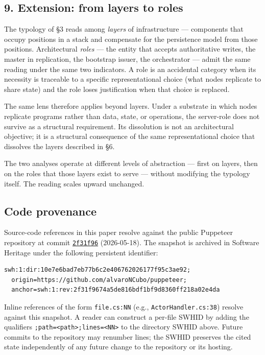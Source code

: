 \documentclass[
]{article}
\begin{document}
\subsection{9. Extension: from layers to
roles}\label{extension-from-layers-to-roles}

The typology of §3 reads among \emph{layers} of infrastructure ---
components that occupy positions in a stack and compensate for the
persistence model from those positions. Architectural \emph{roles} ---
the entity that accepts authoritative writes, the master in replication,
the bootstrap issuer, the orchestrator --- admit the same reading under
the same two indicators. A role is an accidental category when its
necessity is traceable to a specific representational choice (what nodes
replicate to share state) and the role loses justification when that
choice is replaced.

The same lens therefore applies beyond layers. Under a substrate in
which nodes replicate programs rather than data, state, or operations,
the server-role does not survive as a structural requirement. Its
dissolution is not an architectural objective; it is a structural
consequence of the same representational choice that dissolves the
layers described in §6.

The two analyses operate at different levels of abstraction --- first on
layers, then on the roles that those layers exist to serve --- without
modifying the typology itself. The reading scales upward unchanged.

\subsection{Code provenance}\label{code-provenance}

Source-code references in this paper resolve against the public
Puppeteer repository at commit
\href{https://github.com/alvaroNCubo/puppeteer/tree/2f31f9674a5de816bdf1bf9d8360ff218a02e4da}{\texttt{2f31f96}}
(2026-05-18). The snapshot is archived in Software Heritage under the
following persistent identifier:

\begin{verbatim}
swh:1:dir:10e7e6bad7eb77b6c2e406762026177f95c3ae92;
  origin=https://github.com/alvaroNCubo/puppeteer;
  anchor=swh:1:rev:2f31f9674a5de816bdf1bf9d8360ff218a02e4da
\end{verbatim}

Inline references of the form \texttt{file.cs:NN} (e.g.,
\texttt{ActorHandler.cs:38}) resolve against this snapshot. A reader can
construct a per-file SWHID by adding the qualifiers
\texttt{;path=\textless{}path\textgreater{};lines=\textless{}NN\textgreater{}}
to the directory SWHID above. Future commits to the repository may
renumber lines; the SWHID preserves the cited state independently of any
future change to the repository or its hosting.
\end{document}
